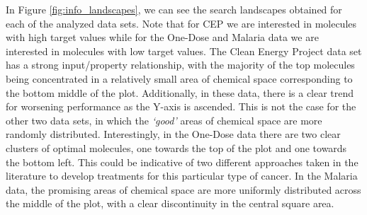 In Figure \ref{fig:info_landscapes}, we can see the search landscapes obtained
for each of the analyzed data sets. Note that for CEP we are interested in molecules with high target values while for the One-Dose and Malaria data we are interested in molecules with low target values.
The Clean Energy Project data set has a strong input/property
relationship, with the majority of the top molecules being concentrated in a
relatively small area of chemical space corresponding to the bottom middle of the plot. 
Additionally, in these data, there
is a clear trend for worsening performance as the Y-axis is ascended.  This is
not the case for the other two data sets, in which the \emph{`good'} areas of chemical
space are more randomly distributed. Interestingly, in the One-Dose
data there are two clear clusters of optimal molecules, one
towards the top of the plot and one towards the bottom left. This could be
indicative of two different approaches taken in the literature to develop treatments for this particular type of cancer. In the Malaria data, the promising areas of chemical space are more uniformly distributed across the middle of the plot, with a clear discontinuity in the central square area.
